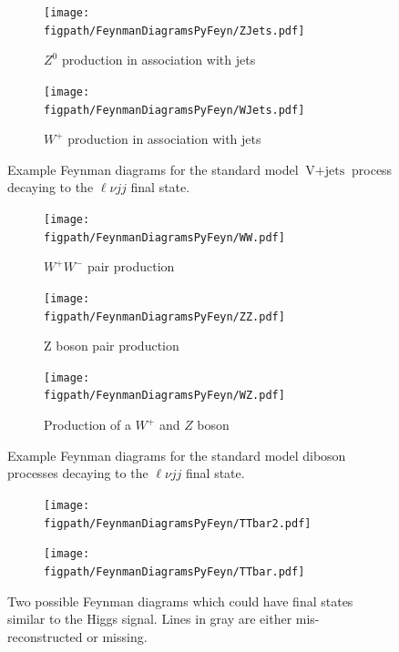 \begin{figure}[!hbt]
  \centering
  \begin{subfigure}[t]{0.46\textwidth}
    \texttt{[image: \\figpath/FeynmanDiagramsPyFeyn/ZJets.pdf]}
  	\caption{$Z^{0}$ production in association with jets}
    \label{fig:ZJets_lvjj}
  \end{subfigure}
  \hspace{0.015\textwidth}
  \begin{subfigure}[t]{0.46\textwidth}
    \texttt{[image: \\figpath/FeynmanDiagramsPyFeyn/WJets.pdf]}
    \caption{$W^{+}$ production in association with jets}
    \label{fig:WJets_lvjj}
  \end{subfigure}
  \caption{Example Feynman diagrams for the standard model $\text{V}+\text{jets}$ process decaying to the $\ell\nu{jj}$ final state.}
  \label{fig:SingleBosonBackground}
\end{figure}
\begin{figure}[!hbt]
  \centering
  \begin{subfigure}[t]{0.3\textwidth}
    \texttt{[image: \\figpath/FeynmanDiagramsPyFeyn/WW.pdf]}
    \caption{$W^{+}W^{-}$ pair production}
    \label{fig:WW}
  \end{subfigure}
  \hspace{0.015\textwidth}
  \begin{subfigure}[t]{0.3\textwidth}
    \texttt{[image: \\figpath/FeynmanDiagramsPyFeyn/ZZ.pdf]}
    \caption{Z boson pair production}
    \label{fig:ZZ}
  \end{subfigure}
  \hspace{0.015\textwidth}
  \begin{subfigure}[t]{0.3\textwidth}
    \texttt{[image: \\figpath/FeynmanDiagramsPyFeyn/WZ.pdf]}
    \caption{Production of a $W^{+}$ and $Z$ boson}
    \label{fig:WZ}
  \end{subfigure}
  \caption{Example Feynman diagrams for the standard model diboson processes decaying to the $\ell\nu{jj}$ final state.}
  \label{fig:DibosonBackground}
\end{figure}
\begin{figure}[!hbt]
  \centering
  \begin{subfigure}[t]{0.46\textwidth}
    \texttt{[image: \\figpath/FeynmanDiagramsPyFeyn/TTbar2.pdf]}
    \caption{}
    \label{fig:TTbar_lvlvbb}
  \end{subfigure}
  \hspace{0.015\textwidth}
  \begin{subfigure}[t]{0.46\textwidth}
    \texttt{[image: \\figpath/FeynmanDiagramsPyFeyn/TTbar.pdf]}
    \caption{}
    \label{fig:TTbar_lvjjbb}
  \end{subfigure}
  \caption{Two possible \ttbar Feynman diagrams which could have final states similar to the Higgs signal. Lines in gray are either mis-reconstructed or missing.}
  \label{fig:TTbarBackground}
\end{figure}
